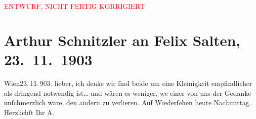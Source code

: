 
\begin{center}
            \textcolor{red}{ENTWURF, NICHT FERTIG KORRIGIERT}
                      \end{center}
            
         
         \renewcommand{\erwaehntePersonen}{Personen: Felix Salten}
         \renewcommand{\erwaehnteOrte}{Orte: Wien}
         \renewcommand{\erwaehnteWerke}{}
               \section[Arthur Schnitzler an Felix Salten, 23. 11. 1903]{ Arthur Schnitzler an Felix Salten, 23. 11. 1903}\nopagebreak{}\rehead{ }\begin{ledgroupsized}[t]{13cm}\normalsize\beginnumbering \toendnotes[C]{\smallbreak\pagebreak[2]} 
\pstart
           \raggedleft{}{\pb}Wien23. 11. 903.
               \pend
           \pstart
           lieber, ich denke wir ſind beide
      um eine Kleinigkeit empfindlicher
      als dringend notwendig ist{\dots}
      und wären es weniger, we{\geminationn}
      einer von uns der Gedanke
      unſchmerzlich wäre, den andern
      zu verlieren. Auf Wiederſehen
      heute Nachmittag. Herzlichſt Ihr\pend
           \pstart \spacefill\mbox{A.}\pend{}
         
         \endnumbering{}\end{ledgroupsized}\begin{anhang}\end{anhang}\newcommand{\dateiname}{L02990}\newcommand{\titel}{Arthur Schnitzler an Felix Salten, 23. 11. 1903}\newcommand{\editorInnen}{Martin Anton Müller und Laura Untner}
      